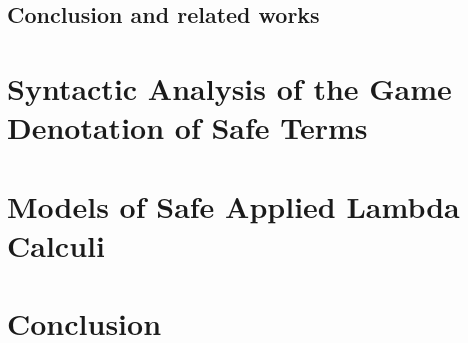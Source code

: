 \documentclass[11pt,a4paper,draft]{myown}
\begin{document}
    \section{Conclusion and related works}
    


\chapter{Syntactic Analysis of the Game Denotation of Safe Terms}
    \label{chap:syntactic_gamesem}
    


\chapter{Models of Safe Applied Lambda Calculi}
    \label{chap:model}
    

\chapter{Conclusion}
    \label{chap:conclusion}
    




\pdfsyncstop

\cleardoublepage
{}
{}
  
  

  \cleardoublepage
  \printnotations

  \clearpage
  \printindex

\pdfsyncstart
\end{document}
